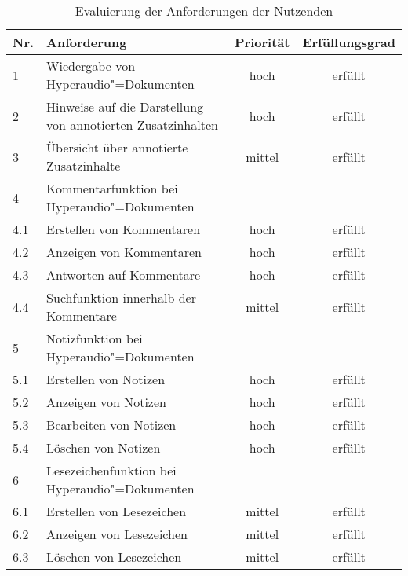 \begin{table}[!ht]
\def\arraystretch{1.4}
\caption{Evaluierung der Anforderungen der Nutzenden}
\label{tab:EvalAnforderungenNutzenden}
\begin{tabularx}{\textwidth}{lXcc}      
    \hline
    Nr. & Anforderung & Priorität & Erfüllungsgrad
    \\\hline
    1 & Wiedergabe von Hyperaudio"=Dokumenten & hoch & erfüllt\\
    2 & Hinweise auf die Darstellung von annotierten Zusatzinhalten & hoch & erfüllt\\
    3 & Übersicht über annotierte Zusatzinhalte & mittel & erfüllt\\
    4 & Kommentarfunktion bei Hyperaudio"=Dokumenten & & \\
    4.1 & \hspace*{0.5cm} Erstellen von Kommentaren & hoch & erfüllt\\
    4.2 & \hspace*{0.5cm} Anzeigen von Kommentaren & hoch & erfüllt\\
    4.3 & \hspace*{0.5cm} Antworten auf Kommentare & hoch & erfüllt\\
    4.4 & \hspace*{0.5cm} Suchfunktion innerhalb der Kommentare & mittel & erfüllt\\ 
    5 & Notizfunktion bei Hyperaudio"=Dokumenten & & \\
    5.1 & \hspace*{0.5cm} Erstellen von Notizen & hoch & erfüllt\\
    5.2 & \hspace*{0.5cm} Anzeigen von Notizen & hoch & erfüllt\\
    5.3 & \hspace*{0.5cm} Bearbeiten von Notizen & hoch & erfüllt\\
   	5.4 & \hspace*{0.5cm} Löschen von Notizen & hoch & erfüllt\\
    6 & Lesezeichenfunktion bei Hyperaudio"=Dokumenten & & \\
    6.1 & \hspace*{0.5cm} Erstellen von Lesezeichen & mittel & erfüllt\\
    6.2 & \hspace*{0.5cm} Anzeigen von Lesezeichen & mittel & erfüllt\\
   	6.3 & \hspace*{0.5cm} Löschen von Lesezeichen & mittel & erfüllt\\

\end{tabularx}
\end{table}
